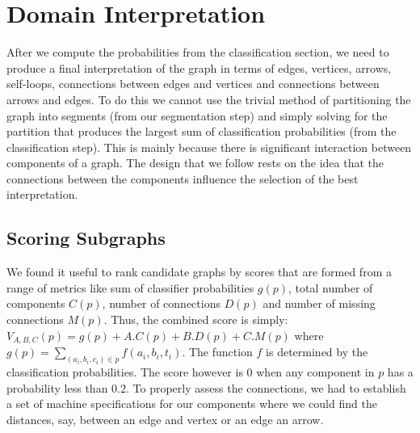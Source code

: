 \section{Domain Interpretation}
\label{sec:interpretation}
After we compute the probabilities from the classification section, we need to produce a final interpretation of the graph in terms of edges, vertices, arrows, self-loops, connections between edges and vertices and connections between arrows and edges. To do this we cannot use the trivial method of partitioning the graph into segments (from our segmentation step) and simply solving for the partition that produces the largest sum of classification probabilities (from the classification step). This is mainly because there is significant interaction between components of a graph. The design that we follow rests on the idea that the connections between the components influence the selection of the best interpretation.\\

\subsection{Scoring Subgraphs}

We found it useful to rank candidate graphs by scores that are formed from a range of metrics like sum of classifier probabilities $g(p)$, total number of components $C(p)$, number of connections $D(p)$ and number of missing connections $M(p)$. Thus, the combined score is simply: $V_{A,B,C}(p) = g(p) + A.C(p) + B.D(p) + C.M(p)$ where $g(p) = \sum_{(a_i,b_i,c_i) \in p}f(a_i, b_i, t_i)$. The function $f$ is determined by the classification probabilities. The score however is 0 when any component in $p$ has a probability less than 0.2. To properly assess the connections, we had to establish a set of machine specifications for our components where we could find the distances, say, between an edge and vertex or an edge an arrow.\\

